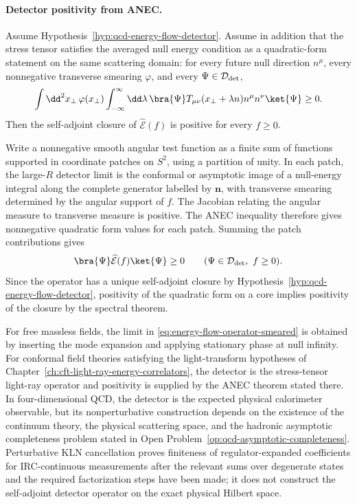\paragraph{Detector positivity from ANEC.}
Assume Hypothesis~\ref{hyp:qcd-energy-flow-detector}.  Assume in addition
that the stress tensor satisfies the averaged null energy condition as a
quadratic-form statement on the same scattering domain: for every future null
direction \(n^\mu\), every nonnegative transverse smearing
\(\varphi\), and every \(\Psi\in\mathcal D_{\rm det}\),
\[
  \int\dd^2x_\perp\,\varphi(x_\perp)
  \int_{-\infty}^{\infty}\dd\lambda\,
  \bra{\Psi}T_{\mu\nu}(x_\perp+\lambda n)n^\mu n^\nu\ket{\Psi}
  \geq0 .
\]
Then the self-adjoint closure of \(\widehat{\mathcal E}(f)\) is positive for
every \(f\geq0\).

Write a nonnegative smooth angular test function as a finite sum of functions
supported in coordinate patches on \(S^2\), using a partition of unity.  In
each patch, the large-\(R\) detector limit is the conformal or asymptotic
image of a null-energy integral along the complete generator labelled by
\(\mathbf n\), with transverse smearing determined by the angular support of
\(f\).  The Jacobian relating the angular measure to transverse measure is
positive.  The ANEC inequality therefore gives nonnegative quadratic form
values for each patch.  Summing the patch contributions gives
\[
  \bra{\Psi}\widehat{\mathcal E}(f)\ket{\Psi}\geq0
  \qquad (\Psi\in\mathcal D_{\rm det},\ f\geq0).
\]
Since the operator has a unique self-adjoint closure by
Hypothesis~\ref{hyp:qcd-energy-flow-detector}, positivity of the quadratic
form on a core implies positivity of the closure by the spectral theorem.

\begin{remark}
\label{rem:qcd-energy-flow-status}
For free massless fields, the limit in
\eqref{eq:energy-flow-operator-smeared} is obtained by inserting the mode
expansion and applying stationary phase at null infinity.  For conformal
field theories satisfying the light-transform hypotheses of
Chapter~\ref{ch:cft-light-ray-energy-correlators}, the detector is the
stress-tensor light-ray operator and positivity is supplied by the ANEC
theorem stated there.  In four-dimensional QCD, the detector is the expected
physical calorimeter observable, but its nonperturbative construction depends
on the existence of the continuum theory, the physical scattering space, and
the hadronic asymptotic completeness problem stated in
Open Problem~\ref{op:qcd-asymptotic-completeness}.  Perturbative KLN
cancellation proves finiteness of regulator-expanded coefficients for
IRC-continuous measurements after the relevant sums over degenerate states
and the required factorization steps have been made; it does not construct
the self-adjoint detector operator on the exact physical Hilbert space.
\end{remark}

